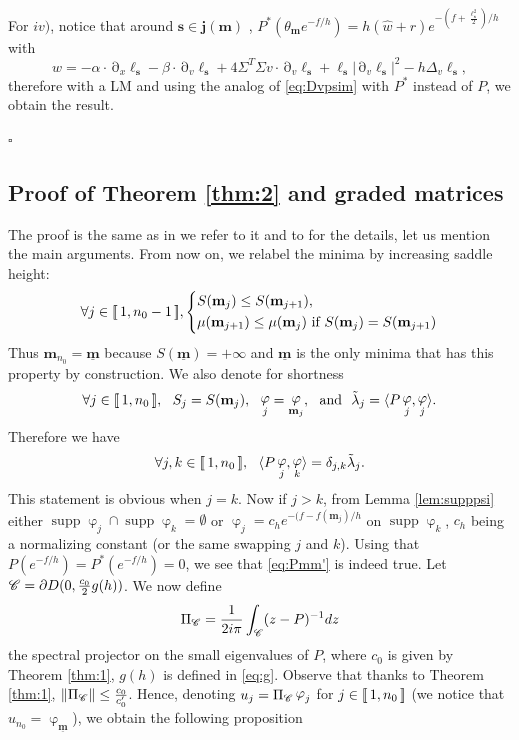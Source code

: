 \documentclass[12pt]{amsart}
\newcommand{\supp}{\operatorname{supp}}
\def\<{\langle}
\def\>{\rangle}
\newcommand{\ep}{\hfill $\square$}
\numberwithin{equation}{section}
\numberwithin{figure}{section}
\def\m{\mathbf{m}}
\def\s{\mathbf{s}}
\def\j{\mathbf{j}}
\def\um{\underline{\m}}
\DeclareMathOperator{\p}{\partial}
\DeclareMathOperator{\phii}{\varphi}
\newcommand{\vvert}[1]{\left\lVert#1\right\rVert}
\newcommand{\lb}{\operatorname{[\negthinspace [}}
\newcommand{\rb}{\operatorname{]\negthinspace ]}}
\begin{document}
For $iv)$, notice that around $\s\in\j(\m)$%
, $P^*(\theta_\m e^{-f/h}) = h(\hat w + r)e^{-(f+\frac{\ell_\s^{2}}{2})/h}$ with %
\begin{equation*}
\hat w = - \alpha\cdot\p_x\ell_\s - \beta\cdot\p_v\ell_\s + 4\Sigma^T\Sigma v\cdot\p_v\ell_\s + \ell_\s|\p_v\ell_\s|^2 - h\Delta_v\ell_\s,
\end{equation*}
therefore with a LM and using the analog of \eqref{eq:Dvpsim} with $P^*$ instead of $P$, we obtain the result.

\ep

\subsection{Proof of Theorem \ref{thm:2} and graded matrices}\label{ssec:proofthm2}
The proof is the same as in \cite{BoLePMi22} we refer to it and to \cite{LePMi20} for the details, let us mention the main arguments. From now on, we relabel the minima by increasing saddle height:
\begin{equation}\label{eq:decreasSmu}
\forall j\in\lb1,n_0-1\rb,\left\{\begin{aligned}
    &S(\m_j) \leq S(\m_{j+1}),\\
    &\mu(\m_{j+1}) \leq \mu(\m_j) \text{ if }S(\m_j) = S(\m_{j+1})
\end{aligned}\right.
\end{equation}
Thus $\m_{n_0} = \um$ because $S(\um) = +\infty$ and $\um$ is the only minima that has this property by construction. We also denote for shortness
\begin{equation*}
\forall j\in\lb1,n_0\rb,\ \ S_j = S(\m_j),\ \ \phii_j = \phii_{\m_j},\ \mbox{ and } \ \tilde{\lambda}_j = \<P\phii_j,\phii_j\>.
\end{equation*}
Therefore we have
\begin{equation}\label{eq:Pmm'}
\forall j,k\in\lb1,n_0\rb,\ \ \<P\phii_j,\phii_k\> = \delta_{j,k}\tilde{\lambda}_j.
\end{equation}
This statement is obvious when $j=k$. Now if $j > k$, from Lemma \ref{lem:supppsi} either $\supp\phii_j\cap\supp\phii_k = \emptyset$ or $\phii_j = c_he^{-(f-f(\m_j)/h}$ on $\supp\phii_k$, $c_h$ being a normalizing constant (or the same swapping $j$ and $k$). Using that $P(e^{-f/h}) = P^*(e^{-f/h}) = 0$, we see that \eqref{eq:Pmm'} is indeed true. Let ${\mathscr C} = \partial D(0,\frac{c_0}2g(h))$. We now define
\begin{equation*}
\Pi_{\mathscr C} = \frac{1}{2i\pi}\int_{{\mathscr C}}(z-P)^{-1}dz
\end{equation*}
the spectral projector on the small eigenvalues of $P$, where $c_0$ is given by Theorem \ref{thm:1}, $g(h)$ is defined in \eqref{eq:g}. Observe that thanks to Theorem \ref{thm:1}, $\vvert{\Pi_\Cr}\leq \frac{c_0}{c_0'}$. Hence, denoting $u_j = \Pi_\Cr\phii_j$ for $j\in\lb1,n_0\rb$ (we notice that $u_{n_0} = \phii_{\um}$), we obtain the following proposition
\end{document}
